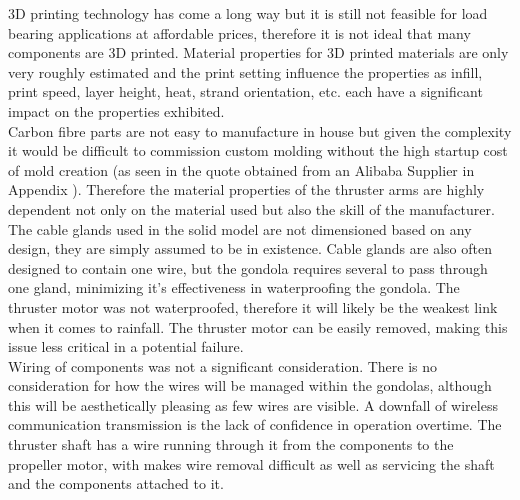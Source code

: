 \documentclass[../main.tex]{subfiles}
\begin{document}
3D printing technology has come a long way but it is still not feasible for load bearing applications at affordable prices, therefore it is not ideal that many components are 3D printed. Material properties for 3D printed materials are only very roughly estimated and the print setting influence the properties as infill, print speed, layer height, heat, strand orientation, etc. each have a significant impact on the properties exhibited.\\

Carbon fibre parts are not easy to manufacture in house but given the complexity it would be difficult to commission custom molding without the high startup cost of mold creation (as seen in the quote obtained from an Alibaba Supplier in Appendix \cite{KEELQUOTE}). Therefore the material properties of the thruster arms are highly dependent not only on the material used but also the skill of the manufacturer.\\

The cable glands used in the solid model are not dimensioned based on any design, they are simply assumed to be in existence. Cable glands are also often designed to contain one wire, but the gondola requires several to pass through one gland, minimizing it's effectiveness in waterproofing the gondola. The thruster motor was not waterproofed, therefore it will likely be the weakest link when it comes to rainfall. The thruster motor can be easily removed, making this issue less critical in a potential failure. \\

Wiring of components was not a significant consideration. There is no consideration for how the wires will be managed within the gondolas, although this will be aesthetically pleasing as few wires are visible. A downfall of wireless communication transmission is the lack of confidence in operation overtime. The thruster shaft has a wire running through it from the components to the propeller motor, with makes wire removal difficult as well as servicing the shaft and the components attached to it.\\
\end{document}
